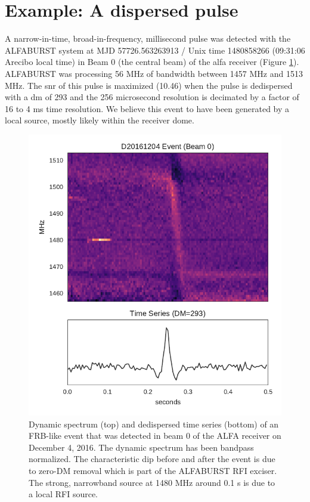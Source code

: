 \documentclass[a4paper,fleqn,usenatbib]{mnras}
\begin{document}
\section{Example: A dispersed pulse}
\label{sec:D20161204}

A narrow-in-time, broad-in-frequency, millisecond pulse was detected with the
ALFABURST \citep{2017ApJS..228...21C} system at MJD 57726.563263913 / Unix time
1480858266 (09:31:06 Arecibo local time) in Beam 0 (the central beam) of the
\gls{alfa} receiver (Figure \ref{fig:beam0_dynamic_spec}). ALFABURST was
processing 56 MHz of bandwidth between 1457 MHz and 1513 MHz. The \gls{snr} of
this pulse is maximized (10.46) when the pulse is dedispersed with a \gls{dm} of
293 and the 256 microsecond resolution is decimated by a factor of 16 to 4 ms
time resolution. We believe this event to have been generated by a local source,
mostly likely within the receiver dome.
%
\begin{figure}
    \includegraphics[width=1.0\linewidth]{figures/D20161204_buf23_Beam0.pdf}
    \caption{Dynamic spectrum (top) and dedispersed time series (bottom) of an
    FRB-like event that was detected in beam 0 of the ALFA receiver on December
    4, 2016. The dynamic spectrum has been bandpass normalized. The
    characteristic dip before and after the event is due to zero-DM removal
    which is part of the ALFABURST RFI exciser. The strong, narrowband source at
    1480 MHz around 0.1 s is due to a  local RFI source.
    }
    \label{fig:beam0_dynamic_spec}
\end{figure}
\end{document}
